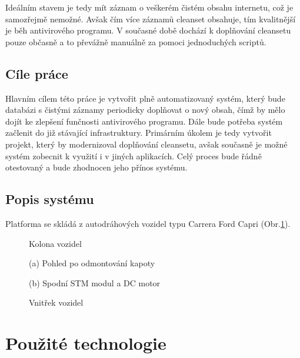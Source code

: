 \documentclass[thesis=M,czech,hidelinks]{FITthesis}[2013/05/06]
\begin{document}
Ideálním stavem je tedy mít záznam o veškerém čistém obsahu internetu, což je samozřejmě nemožné. Avšak čím více záznamů cleanset obsahuje, tím kvalitnější je běh antivirového programu. V současné době dochází k doplňování cleansetu pouze občasně a to převážně manuálně za pomoci jednoduchých scriptů.

\section{Cíle práce} 
 Hlavním cílem této práce je vytvořit plně automatizovaný systém, který bude databázi s čistými záznamy periodicky doplňovat o nový obsah, čímž by mělo dojít ke zlepšení funčnosti antivirového programu. Dále bude potřeba systém začlenit do již stávající  infrastruktury. Primárním úkolem je tedy vytvořit projekt, který by modernizoval doplňování cleansetu, avšak současně je možné systém zobecnit k využití i v jiných aplikacích. Celý proces bude řádně otestovaný a bude zhodnocen jeho přínos systému.


\section{Popis systému}
Platforma se skládá z autodráhových vozidel typu Carrera Ford Capri (Obr.\ref{fig:kolona}).
\begin{figure}[h]
        \centering
        \caption{Kolona vozidel}
        \label{fig:kolona}
\end{figure}

 \begin{figure}[h]
         \centering

         \begin{minipage}[b]{0.49\textwidth}
                 \caption*{(a) Pohled po odmontování kapoty}
                 \label{fig:car2}
 		\end{minipage}
         \begin{minipage}[b]{0.49\textwidth}
                 \caption*{(b) Spodní STM modul a DC motor}
                 \label{fig:car1}
         \end{minipage}
 	\caption{Vnitřek vozidel}
 	\label{fig:cars}
 \end{figure}

\chapter{Použité technologie}
\end{document}
